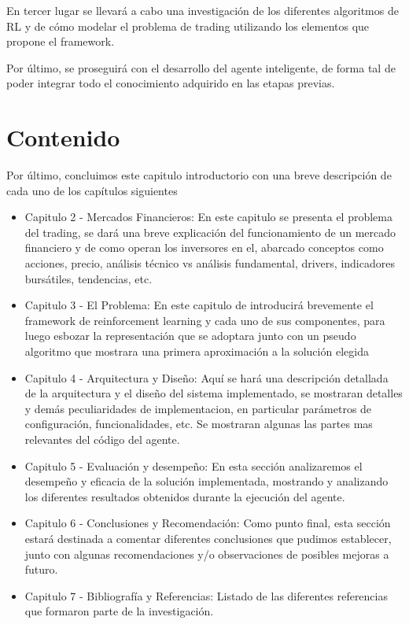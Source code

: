 En tercer lugar se llevará a cabo una investigación de los diferentes algoritmos de RL y de cómo modelar el problema de trading utilizando los elementos que propone el framework.

Por último, se proseguirá con el desarrollo del agente inteligente, de forma tal de poder integrar todo el conocimiento adquirido en las etapas previas. 

\section{Contenido}
Por último, concluimos este capitulo introductorio con una breve descripción de cada uno de los capítulos siguientes

\begin{itemize} %
	
	\item Capitulo 2 - Mercados Financieros: En este capitulo se presenta el problema del trading, se dará una breve explicación del funcionamiento de un mercado financiero y de como operan los inversores en el, abarcado conceptos como acciones, precio, análisis técnico vs análisis fundamental, drivers, indicadores bursátiles, tendencias, etc.
	
	\item Capitulo 3 - El Problema: En este capitulo de introducirá brevemente el framework de reinforcement learning y cada uno de sus componentes, para luego esbozar la representación que se adoptara junto con un pseudo algoritmo que mostrara una primera aproximación a la solución elegida
	
	\item Capitulo 4 - Arquitectura y Diseño: Aquí se hará una descripción detallada de la arquitectura y el diseño del sistema implementado, se mostraran detalles y demás peculiaridades de implementacion, en particular parámetros de configuración, funcionalidades, etc. Se mostraran algunas las partes mas relevantes del código del agente.
	
	\item Capitulo 5 - Evaluación y desempeño: En esta sección analizaremos el desempeño y eficacia de la solución implementada, mostrando y analizando los diferentes resultados obtenidos durante la ejecución del agente.
	
	\item Capitulo 6 - Conclusiones y Recomendación: Como punto final, esta sección estará destinada a comentar diferentes conclusiones que pudimos establecer, junto con algunas recomendaciones y/o observaciones de posibles mejoras a futuro.
	
	\item Capitulo 7 - Bibliografía y Referencias: Listado de las diferentes referencias que formaron parte de la investigación.
\end{itemize}
